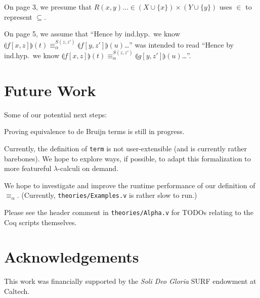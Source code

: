\documentclass{article}
\begin{document}
On page 3, we presume that $R(x,y) \dots \in (X \cup \{ x \}) \times (Y \cup \{ y \})$ uses $\in$ to
represent $\subseteq$.

On page 5, we assume that ``Hence by ind.hyp.\ we know $\llparenthesis f[x,z] \rrparenthesis (t)
\equiv_\alpha^{S(z,z')} \llparenthesis f[y,z'] \rrparenthesis (u)$\dots'' was intended to read
``Hence by ind.hyp.\ we know $\llparenthesis f[x,z] \rrparenthesis (t) \equiv_\alpha^{S(z,z')}
\llparenthesis g[y,z'] \rrparenthesis (u)$\dots''.

\section{Future Work}

Some of our potential next steps:

Proving equivalence to de Bruijn terms is still in progress.

Currently, the definition of \verb|term| is not user-extensible (and is currently rather barebones).
We hope to explore ways, if possible, to adapt this formalization to more featureful
$\lambda$-calculi on demand.

We hope to investigate and improve the runtime performance of our definition of $\equiv_\alpha$.
(Currently, \verb|theories/Examples.v| is rather slow to run.)

Please see the header comment in \verb|theories/Alpha.v| for TODOs relating to the Coq scripts
themselves.

\section{Acknowledgements}

This work was financially supported by the \emph{Soli Deo Gloria} SURF endowment at Caltech.
\end{document}
